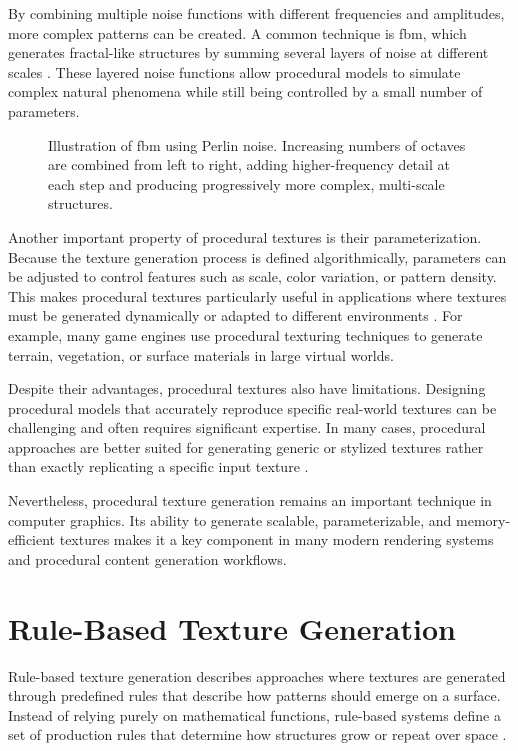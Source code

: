 By combining multiple noise functions with different frequencies and amplitudes, more complex patterns can be created. A common technique is \gls{fbm}, which generates fractal-like structures by summing several layers of noise at different scales \cite{ebert2003texturing}. These layered noise functions allow procedural models to simulate complex natural phenomena while still being controlled by a small number of parameters.

\begin{figure}[H]
    \centering
    {Illustration of \gls{fbm} using Perlin noise. Increasing numbers of octaves are combined from left to right, adding higher-frequency detail at each step and producing progressively more complex, multi-scale structures.}
    \label{fig:perlin-octaves-comparison}
\end{figure}

Another important property of procedural textures is their parameterization. Because the texture generation process is defined algorithmically, parameters can be adjusted to control features such as scale, color variation, or pattern density. This makes procedural textures particularly useful in applications where textures must be generated dynamically or adapted to different environments \cite{akenine2018realtime}. For example, many game engines use procedural texturing techniques to generate terrain, vegetation, or surface materials in large virtual worlds.

Despite their advantages, procedural textures also have limitations. Designing procedural models that accurately reproduce specific real-world textures can be challenging and often requires significant expertise. In many cases, procedural approaches are better suited for generating generic or stylized textures rather than exactly replicating a specific input texture \cite{ebert2003texturing}.

Nevertheless, procedural texture generation remains an important technique in computer graphics. Its ability to generate scalable, parameterizable, and memory-efficient textures makes it a key component in many modern rendering systems and procedural content generation workflows.


\section{Rule-Based Texture Generation}

Rule-based texture generation describes approaches where textures are generated through predefined rules that describe how patterns should emerge on a surface. Instead of relying purely on mathematical functions, rule-based systems define a set of production rules that determine how structures grow or repeat over space \cite{prusinkiewicz1990algorithmic}.

